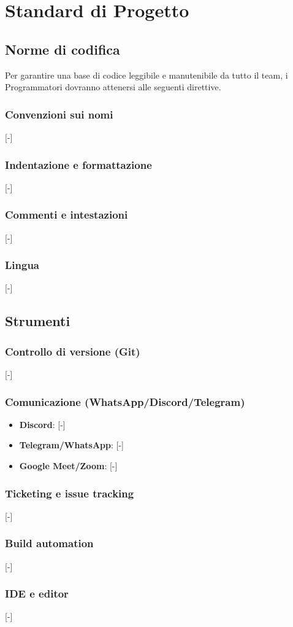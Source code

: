 \section{Standard di Progetto}

\subsection{Norme di codifica}
Per garantire una base di codice leggibile e manutenibile da tutto il team, i Programmatori dovranno attenersi alle seguenti direttive.

\subsubsection{Convenzioni sui nomi}
[-]

\subsubsection{Indentazione e formattazione}
[-]

\subsubsection{Commenti e intestazioni}
[-]

\subsubsection{Lingua}
[-]

\subsection{Strumenti}
\subsubsection{Controllo di versione (Git)}
[-]

\subsubsection{Comunicazione (WhatsApp/Discord/Telegram)}
\begin{itemize}
	\item \textbf{Discord}: [-]
	\item \textbf{Telegram/WhatsApp}: [-]
	\item \textbf{Google Meet/Zoom}: [-]
\end{itemize}

\subsubsection{Ticketing e issue tracking}
[-]

\subsubsection{Build automation}
[-]

\subsubsection{IDE e editor}
[-]